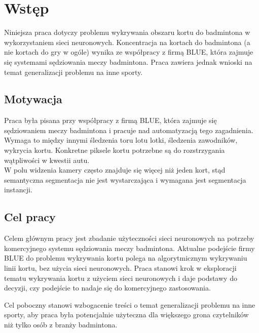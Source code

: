 \chapter{Wstęp}

Niniejsza praca dotyczy problemu wykrywania obszaru kortu do badmintona w wykorzystaniem sieci neuronowych.
Koncentracja na kortach do badmintona (a nie kortach do gry w ogóle) wynika ze współpracy z firmą BLUE, która zajmuje się systemami sędziowania meczy badmintona. Praca zawiera jednak wnioski na temat generalizacji problemu na inne sporty.

\section{Motywacja}

Praca była pisana przy współpracy z firmą BLUE, która zajmuje się sędziowaniem meczy badmintona i pracuje nad automatyzacją tego zagadnienia. Wymaga to między innymi śledzenia toru lotu lotki, śledzenia zawodników, wykrycia kortu. Konkretne piksele kortu potrzebne są do rozstrzygania wątpliwości w kwestii autu. \\

W polu widzenia kamery często znajduje się więcej niż jeden kort, stąd semantyczna segmentacja nie jest wystarczająca i wymagana jest segmentacja instancji.

\section{Cel pracy}

Celem głównym pracy jest zbadanie użyteczności sieci neuronowych na potrzeby komercyjnego systemu sędziowania meczy badmintona. Aktualne podejście firmy BLUE do problemu wykrywania kortu polega na algorytmicznym wykrywaniu linii kortu, bez użycia sieci neuronowych. Praca stanowi krok w eksploracji tematu wykrywania kortu z użyciem sieci neuronowych i daje podstawy do decyzji, czy podejście to nadaje się do komercyjnego zastosowania.

Cel poboczny stanowi wzbogacenie treści o temat generalizacji problemu na inne sporty, aby praca była potencjalnie użyteczna dla większego grona czytelników niż tylko osób z branży badmintona.



